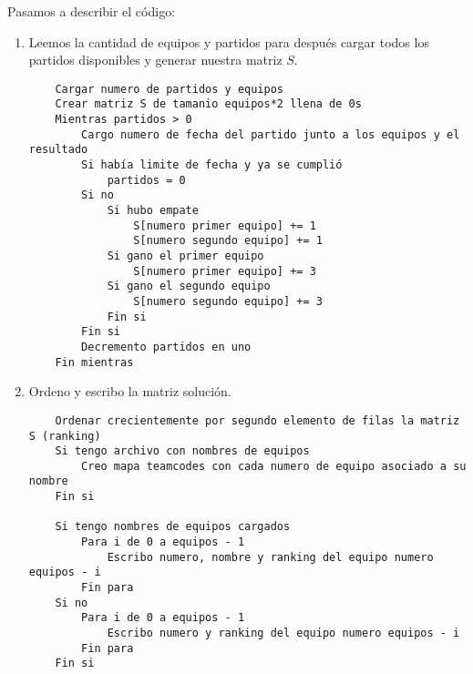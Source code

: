 Pasamos a describir el código:

\begin{enumerate}
	\item Leemos la cantidad de equipos y partidos para después cargar todos los
	partidos disponibles y generar nuestra matriz $S$.
	\begin{lstlisting}
	Cargar numero de partidos y equipos
	Crear matriz S de tamanio equipos*2 llena de 0s
	Mientras partidos > 0
		Cargo numero de fecha del partido junto a los equipos y el resultado
		Si había limite de fecha y ya se cumplió
			partidos = 0
		Si no
			Si hubo empate
				S[numero primer equipo] += 1
				S[numero segundo equipo] += 1
			Si gano el primer equipo
				S[numero primer equipo] += 3
			Si gano el segundo equipo
				S[numero segundo equipo] += 3
			Fin si
		Fin si
		Decremento partidos en uno
	Fin mientras
	\end{lstlisting}

	\item Ordeno y escribo la matriz solución.
	\begin{lstlisting}
	Ordenar crecientemente por segundo elemento de filas la matriz S (ranking)
	Si tengo archivo con nombres de equipos
		Creo mapa teamcodes con cada numero de equipo asociado a su nombre
	Fin si

	Si tengo nombres de equipos cargados
		Para i de 0 a equipos - 1
			Escribo numero, nombre y ranking del equipo numero equipos - i
		Fin para
	Si no
		Para i de 0 a equipos - 1
			Escribo numero y ranking del equipo numero equipos - i
		Fin para
	Fin si
	\end{lstlisting}

\end{enumerate}
